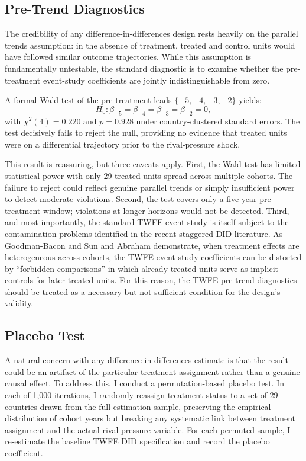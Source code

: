 \documentclass[11pt]{article}
\begin{document}
\subsection{Pre-Trend Diagnostics}

The credibility of any difference-in-differences design rests heavily on the parallel trends assumption: in the absence of treatment, treated and control units would have followed similar outcome trajectories. While this assumption is fundamentally untestable, the standard diagnostic is to examine whether the pre-treatment event-study coefficients are jointly indistinguishable from zero.

A formal Wald test of the pre-treatment leads $\{-5,-4,-3,-2\}$ yields:
\begin{equation}
 H_0: \beta_{-5} = \beta_{-4} = \beta_{-3} = \beta_{-2} = 0,
\end{equation}
with $\chi^2(4) = 0.220$ and $p = 0.928$ under country-clustered standard errors. The test decisively fails to reject the null, providing no evidence that treated units were on a differential trajectory prior to the rival-pressure shock.

This result is reassuring, but three caveats apply. First, the Wald test has limited statistical power with only 29 treated units spread across multiple cohorts. The failure to reject could reflect genuine parallel trends or simply insufficient power to detect moderate violations. Second, the test covers only a five-year pre-treatment window; violations at longer horizons would not be detected. Third, and most importantly, the standard TWFE event-study is itself subject to the contamination problems identified in the recent staggered-DID literature. As Goodman-Bacon \cite{goodmanbacon2021} and Sun and Abraham \cite{sunab2021} demonstrate, when treatment effects are heterogeneous across cohorts, the TWFE event-study coefficients can be distorted by ``forbidden comparisons'' in which already-treated units serve as implicit controls for later-treated units. For this reason, the TWFE pre-trend diagnostics should be treated as a necessary but not sufficient condition for the design's validity. 

\subsection{Placebo Test}

A natural concern with any difference-in-differences estimate is that the result could be an artifact of the particular treatment assignment rather than a genuine causal effect. To address this, I conduct a permutation-based placebo test. In each of 1,000 iterations, I randomly reassign treatment status to a set of 29 countries drawn from the full estimation sample, preserving the empirical distribution of cohort years but breaking any systematic link between treatment assignment and the actual rival-pressure variable. For each permuted sample, I re-estimate the baseline TWFE DID specification and record the placebo coefficient.
\end{document}
